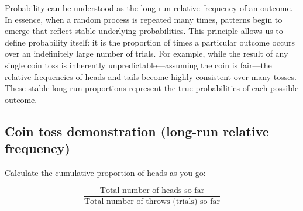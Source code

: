 \documentclass[
  letterpaper,
  DIV=11,
  numbers=noendperiod]{scrreprt}
\begin{document}
Probability can be understood as the long-run relative frequency of an
outcome. In essence, when a random process is repeated many times,
patterns begin to emerge that reflect stable underlying probabilities.
This principle allows us to define probability itself: it is the
proportion of times a particular outcome occurs over an indefinitely
large number of trials. For example, while the result of any single coin
toss is inherently unpredictable---assuming the coin is fair---the
relative frequencies of heads and tails become highly consistent over
many tosses. These stable long-run proportions represent the true
probabilities of each possible outcome.

\subsection{Coin toss demonstration (long-run relative
frequency)}\label{coin-toss-demonstration-long-run-relative-frequency}

Calculate the cumulative proportion of heads as you go:

\[
\frac{\text{Total number of heads so far}}{\text{Total number of throws (trials) so far}}
\]
\end{document}

